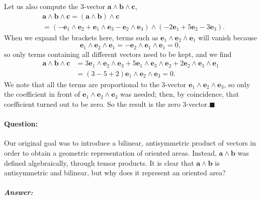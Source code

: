 Let us also compute the 3-vector $\mathbf{a}\wedge\mathbf{b}\wedge\mathbf{c}$,\begin{align*}
 & \mathbf{a}\wedge\mathbf{b}\wedge\mathbf{c}=\left(\mathbf{a}\wedge\mathbf{b}\right)\wedge\mathbf{c}\\
 & =\left(-\mathbf{e}_{1}\wedge\mathbf{e}_{2}+\mathbf{e}_{1}\wedge\mathbf{e}_{3}-\mathbf{e}_{2}\wedge\mathbf{e}_{3}\right)\wedge(-2\mathbf{e}_{1}+5\mathbf{e}_{2}-3\mathbf{e}_{3}).\end{align*}
When we expand the brackets here, terms such as $\mathbf{e}_{1}\wedge\mathbf{e}_{2}\wedge\mathbf{e}_{1}$
will vanish because \[
\mathbf{e}_{1}\wedge\mathbf{e}_{2}\wedge\mathbf{e}_{1}=-\mathbf{e}_{2}\wedge\mathbf{e}_{1}\wedge\mathbf{e}_{1}=0,\]
so only terms containing all different vectors need to be kept, and
we find\begin{align*}
\mathbf{a}\wedge\mathbf{b}\wedge\mathbf{c} & =3\mathbf{e}_{1}\wedge\mathbf{e}_{2}\wedge\mathbf{e}_{3}+5\mathbf{e}_{1}\wedge\mathbf{e}_{3}\wedge\mathbf{e}_{2}+2\mathbf{e}_{2}\wedge\mathbf{e}_{3}\wedge\mathbf{e}_{1}\\
 & =\left(3-5+2\right)\mathbf{e}_{1}\wedge\mathbf{e}_{2}\wedge\mathbf{e}_{3}=0.\end{align*}
We note that all the terms are proportional to the 3-vector $\mathbf{e}_{1}\wedge\mathbf{e}_{2}\wedge\mathbf{e}_{3}$,
so only the coefficient in front of $\mathbf{e}_{1}\wedge\mathbf{e}_{2}\wedge\mathbf{e}_{3}$
was needed; then, by coincidence, that coefficient turned out to be
zero. So the result is the zero 3-vector.\hfill{}$\blacksquare$


\paragraph{Question:}

Our original goal was to introduce a bilinear, antisymmetric product
of vectors in order to obtain a geometric representation of oriented
areas. Instead, $\mathbf{a}\wedge\mathbf{b}$ was defined algebraically,
through tensor products. It is clear that $\mathbf{a}\wedge\mathbf{b}$
is antisymmetric and bilinear, but why does it represent an oriented
area?


\subparagraph{Answer:}

